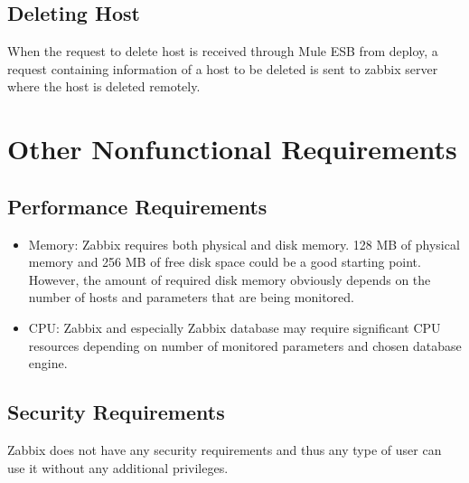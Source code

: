 \documentclass{article}
\begin{document}
\subsection{Deleting Host}

 When the request to delete host is received through Mule ESB from deploy, a request containing information of a host to be deleted is sent to zabbix server where the host is deleted remotely.





\section{Other Nonfunctional Requirements}

\subsection{Performance Requirements}
\begin{itemize}
\item[]Memory:
    Zabbix requires both physical and disk memory. 128 MB of physical memory and 256 MB of free disk space could be a good starting point. However, the amount of required disk memory obviously depends on the number of hosts and parameters that are being monitored.
\item[]CPU:
   Zabbix and especially Zabbix database may require significant CPU resources depending on number of monitored parameters and chosen database engine.
   
 \end{itemize}
\subsection{Security Requirements}
Zabbix does not have any security requirements and thus any type of user can use it without any additional privileges.

\appendix
\end{document}
